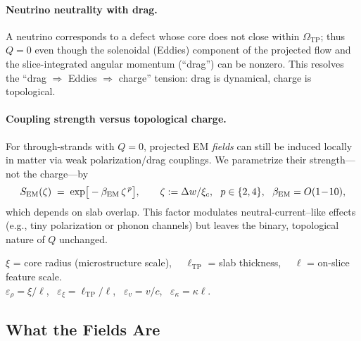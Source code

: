 \paragraph{Neutrino neutrality with drag.}
A neutrino corresponds to a defect whose core does not close within $\Omega_{\mathrm{TP}}$; thus $Q=0$ even though the solenoidal (Eddies) component of the projected flow and the slice-integrated angular momentum (``drag'') can be nonzero. This resolves the ``drag $\Rightarrow$ Eddies $\Rightarrow$ charge'' tension: drag is dynamical, charge is topological.

\paragraph{Coupling strength versus topological charge.}
For through-strands with $Q=0$, projected EM \emph{fields} can still be induced locally in matter via weak polarization/drag couplings. We parametrize their strength—not the charge—by
\begin{equation}
\label{eq:SEM}
S_{\rm EM}(\zeta)\;=\;\exp\!\big[-\beta_{\rm EM}\,\zeta^{\,p}\big],\qquad
\zeta:=\Delta w/\xi_c,\ \ p\in\{2,4\},\ \ \beta_{\rm EM}=O(1\!-\!10),
\end{equation}
which depends on slab overlap. This factor modulates neutral-current–like effects (e.g., tiny polarization or phonon channels) but leaves the binary, topological nature of $Q$ unchanged.

\begin{tcolorbox}[title=Scales and small parameters (at a glance)]
$\xi$ = core radius (microstructure scale), \ \
$\ell_{\mathrm{TP}}$ = slab thickness, \ \
$\ell$ = on-slice feature scale.\\
$\varepsilon_\rho=\xi/\ell$, \ $\varepsilon_\xi=\ell_{\mathrm{TP}}/\ell$, \ $\varepsilon_v=v/c$, \ $\varepsilon_\kappa=\kappa\ell$.
\end{tcolorbox}

\subsection{What the Fields Are}

